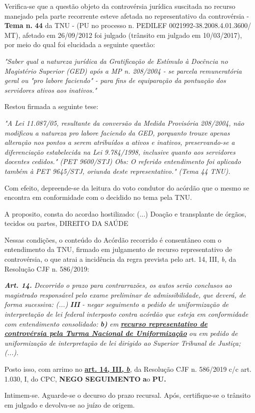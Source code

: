 \documentclass[12pt]{article}
\begin{document}
\justifying
\noindent Verifica-se que a questão objeto da controvérsia jurídica suscitada no recurso manejado pela parte recorrente esteve afetada no representativo da controvérsia - \textbf{Tema n. }\textbf{44} da TNU - (PU no processo n. PEDILEF 0021992-38.2008.4.01.3600/ MT),  afetado em 26/09/2012 foi julgado (trânsito em julgado em 10/03/2017), por meio do qual foi elucidada a seguinte questão:

\noindent \textit{"Saber qual a natureza jurídica da Gratificação de Estímulo à Docência no Magistério Superior (GED) após a MP n. 208/2004 - se parcela remuneratória geral ou "pro labore faciendo" - para fins de equiparação da pontuação dos servidores ativos aos inativos."}

\noindent Restou firmada a seguinte tese:

\noindent \textit{"A Lei 11.087/05, resultante da conversão da Medida Provisória 208/2004, não modificou a natureza pro labore faciendo da GED, porquanto trouxe apenas alteração nos pontos a serem atribuídos a ativos e inativos, preservando-se a diferenciação estabelecida na Lei 9.784/1998, inclusive quanto aos servidores docentes cedidos." (PET 9600/STJ) Obs: O referido entendimento foi aplicado também à PET 9645/STJ, oriunda deste representativo." (Tema 44 TNU).}

\noindent Com efeito, depreende-se da leitura do voto condutor do acórdão que o mesmo se encontra em conformidade com o decidido no  tema pela TNU.

\noindent A proposito, consta do acordao hostilizado: (...) Doação e transplante de órgãos, tecidos ou partes, DIREITO DA SAÚDE

\noindent Nessas condições, o conteúdo do Acórdão recorrido é consentâneo com o entendimento da TNU, firmado em julgamento de recurso representativo de controvérsia, o que atrai a incidência da regra prevista pelo art. 14, III, \textit{b,} da Resolução CJF n. 586/2019:

\noindent \textit{\textbf{Art. 14.}}\textit{ Decorrido o prazo para contrarrazões, os autos serão conclusos ao magistrado responsável pelo exame preliminar de admissibilidade, que deverá, de forma sucessiva: (...) }\textit{\textbf{III }}\textit{- negar seguimento a pedido de uniformização de interpretação de lei federal interposto contra acórdão que esteja em conformidade com entendimento consolidado: }\textit{\textbf{b)}}\textit{ em }\uline{\textit{\textbf{recurso representativo de controvérsia pela Turma Nacional de Uniformização}}}\textit{ ou em pedido de uniformização de interpretação de lei dirigido ao Superior Tribunal de Justiça;(...).}

\noindent Posto isso, com arrimo no \uline{\textbf{art. 14, III, }}\uline{\textit{\textbf{b}}}\textit{,} da Resolução CJF n. 586/2019 c/c art. 1.030, I, do CPC, \textbf{NEGO SEGUIMENTO }\textbf{a}o\textbf{ PU}\textbf{.}

\noindent Intimem-se. Aguarde-se o decurso do prazo recursal. Após, certifique-se o trânsito em julgado e devolva-se ao juízo de origem.
\end{document}
